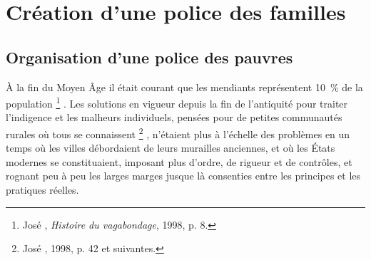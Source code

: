 

\chapter[Création d'une police des familles --- \siecles{14}{18}]{Création d'une police des familles\\}


\section{Organisation d'une police des pauvres}

 À la fin du Moyen Âge il était courant que les mendiants représentent 10~\% de la population%
\footnote{José , \emph{Histoire du vagabondage}, 1998, p. 8.}%
. Les solutions en vigueur depuis la fin de l'antiquité pour traiter l'indigence et les malheurs individuels, pensées pour de petites communautés rurales où tous se connaissent%
\footnote{José , 1998, p. 42 et suivantes.}%
, n'étaient plus à l'échelle des problèmes en un temps où les villes débordaient de leurs murailles anciennes, et où les États modernes se constituaient, imposant plus d'ordre, de rigueur et de contrôles, et rognant peu à peu les larges marges jusque là consenties entre les principes et les pratiques réelles. 

